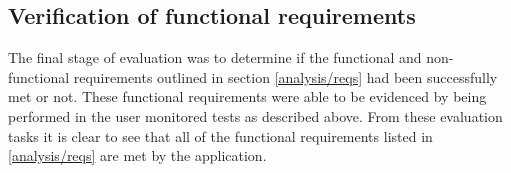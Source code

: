 \documentclass{l4proj}
\begin{document}
\subsection{Verification of functional requirements}

The final stage of evaluation was to determine if the functional and non-functional requirements outlined in section \ref{analysis/reqs} had been successfully met or not. These functional requirements were able to be evidenced by being performed in the user monitored tests as described above. From these evaluation tasks it is clear to see that all of the functional requirements listed in \ref{analysis/reqs} are met by the application.


    
\end{document}
